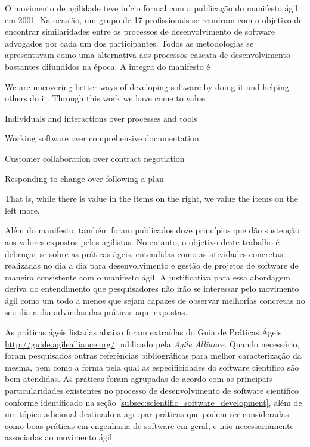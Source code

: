 \documentclass[
	article,			%
	11pt,				%
	oneside,			%
	a4paper,			%
	english,			%
	brazil,				%
	sumario=tradicional
	]{abntex2}
\begin{document}
O movimento de agilidade teve início formal com a publicação do manifesto ágil em 2001. Na ocasião, um grupo de 17 profissionais se reuniram com o objetivo de encontrar similaridades entre os processos de desenvolvimento de software advogados por cada um dos participantes. Todos as metodologias se apresentavam como uma alternativa aos processos cascata de desenvolvimento bastantes difundidos na época. A integra do manifesto é

\begin{citacao}
We are uncovering better ways of developing software by doing it and helping others do it. Through this work we have come to value:

Individuals and interactions over processes and tools

Working software over comprehensive documentation

Customer collaboration over contract negotiation

Responding to change over following a plan

That is, while there is value in the items on the right, we value the items on the left more.
\end{citacao}

Além do manifesto, também foram publicados doze princípios que dão sustenção aos valores expostos pelos agilistas. No entanto, o objetivo deste trabalho é debruçar-se sobre as práticas ágeis, entendidas como as atividades concretas realizadas no dia a dia para desenvolvimento e gestão de projetos de software de maneira consistente com o manifesto ágil. A justificativa para essa abordagem deriva do entendimento que pesquisadores não irão se interessar pelo movimento ágil como um todo a menos que sejam capazes de observar melhorias concretas no seu dia a dia advindas das práticas aqui expostas.

As práticas ágeis listadas abaixo foram extraídas do Guia de Práticas Ágeis \url{http://guide.agilealliance.org/} publicado pela \emph{Agile Alliance}. Quando necessário, foram pesquisados outras referências bibliográficas para melhor caracterização da mesma, bem como a forma pela qual as especificidades do software científico são bem atendidas. As práticas foram agrupadas de acordo com as principais particularidades existentes no processo de desenvolvimento de software científico conforme identificado na seção \ref{subsec:scientific_software_development}, além de um tópico adicional destinado a agrupar práticas que podem ser consideradas como boas práticas em engenharia de software em geral, e não necessariamente associadas ao movimento ágil.
\end{document}

